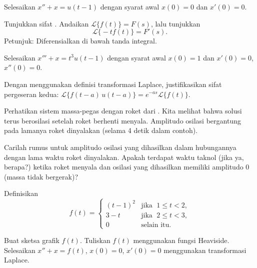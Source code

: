 \begin{exercise}
Selesaikan $x'' + x = u(t-1)$ dengan syarat awal $x(0) = 0$ dan $x'(0) = 0$.
\end{exercise}

\begin{exercise}
Tunjukkan sifat .  Andaikan
$\mathcal{L} \bigl\{ f(t) \bigr\} = F(s)$, lalu tunjukkan
\begin{equation*}
\mathcal{L} \bigl\{ -t f(t) \bigr\} = F'(s) .
\end{equation*}
Petunjuk: Diferensialkan di bawah tanda integral.
\end{exercise}

\begin{exercise}
Selesaikan $x''' + x = t^3 u(t-1)$ dengan syarat awal $x(0) = 1$ dan $x'(0) =
0$, $x''(0) = 0$.
\end{exercise}

\begin{exercise}
Dengan menggunakan definisi transformasi Laplace,
justifikasikan sifat pergeseran kedua: 
$\mathcal{L} \bigl\{ f(t-a) \, u(t-a) \bigr\}
= e^{-as} \mathcal{L} \bigl\{ f(t) \bigr\}$.
\end{exercise}

\begin{exercise}
Perhatikan sistem massa-pegas dengan roket dari
.  Kita melihat bahwa solusi terus berosilasi
setelah roket berhenti menyala.  Amplitudo osilasi bergantung
pada lamanya roket dinyalakan (selama 4 detik dalam contoh).
\begin{tasks}
\task
Carilah rumus untuk amplitudo osilasi yang dihasilkan
dalam hubungannya dengan lama waktu roket dinyalakan.
\task
 Apakah terdapat
waktu taknol (jika ya, berapa?)
ketika roket menyala dan osilasi yang dihasilkan
memiliki amplitudo 0 (massa tidak bergerak)?
\end{tasks}
\end{exercise}

\begin{exercise}
Definisikan
\begin{equation*}
f(t) =
\begin{cases}
{(t-1)}^2 & \text{jika } \; 1 \leq t < 2, \\
3-t & \text{jika } \; 2 \leq t < 3, \\
0 & \text{selain itu} .
\end{cases}
\end{equation*}
\begin{tasks}
\task Buat sketsa grafik $f(t)$.
\task Tuliskan $f(t)$ menggunakan fungsi Heaviside.
\task Selesaikan $x''+x=f(t)$, $x(0)=0$, $x'(0) = 0$ menggunakan transformasi Laplace.
\end{tasks}
\end{exercise}

